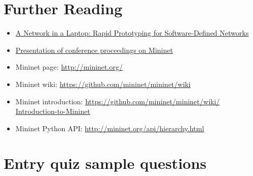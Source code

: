 \documentclass[a4paper]{article}
\begin{document}
\section{Further Reading}

\begin{itemize}
    \item \href{https://qosip.tmit.bme.hu/foswiki/pub/Meres/OpenFlowMScMeresiSegedlet/a19-lantz.pdf}{A Network in a
              Laptop: Rapid Prototyping for Software-Defined Networks}
    \item

          \href{https://qosip.tmit.bme.hu/foswiki/pub/Meres/OpenFlowMScMeresiSegedlet/mininet-hotnets2010-final.pdf}{Presentation
              of conference proceedings on Mininet}
    \item	Mininet page: \url{http://mininet.org/}
    \item	Mininet wiki: \url{https://github.com/mininet/mininet/wiki}
    \item	Mininet introduction: \url{https://github.com/mininet/mininet/wiki/  Introduction-to-Mininet}
    \item	Mininet Python API: \url{http://mininet.org/api/hierarchy.html}
\end{itemize}

\appendix

\section{Entry quiz sample questions}

\end{document}
